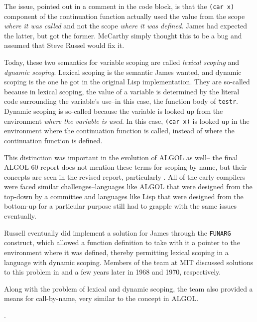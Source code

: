 The issue, pointed out in a comment in the code block, is that the \texttt{(car x)}
component of the continuation function actually used the value from the scope
\textit{where it was called} and not the scope \textit{where it was defined}.
James had expected the latter, but got the former.
McCarthy simply thought this to be a bug and assumed that Steve Russel would fix it.

Today, these two semantics for variable scoping are called \textit{lexical scoping}
and \textit{dynamic scoping}.
Lexical scoping is the semantic James wanted, and dynamic scoping is the one he got
in the original Lisp implementation.
They are so-called because in lexical scoping, the value of a variable is determined
by the literal code surrounding the variable's use--in this case, the function body
of \texttt{testr}.
Dynamic scoping is so-called because the variable is looked up from the environment
\textit{where the variable is used}. In this case, \texttt{(car x)} is looked up in the
environment where the continuation function is called, instead of where the continuation
function is defined.

This distinction was important in the evolution of ALGOL as well--
the final ALGOL 60 report does not mention these terms for scoping by name,
but their concepts are seen in the revised report, particularly
\cite[Section 4.7.3.3. Body replacement and execution]{revised_report_on_the_algorithmic_language_algol_68_1976}.
All of the early compilers were faced similar challenges--languages like ALGOL
that were designed from the top-down by a committee and languages like Lisp
that were designed from the bottom-up for a particular purpose still had to
grapple with the same issues eventually.

Russell eventually did implement a solution for James through the \texttt{FUNARG}
construct, which allowed a function definition to take with it a pointer to the
environment where it was defined, thereby permitting lexical scoping in a language
with dynamic scoping.
Members of the team at MIT discussed solutions to this problem in
and
a few years later in 1968 and 1970, respectively.

Along with the problem of lexical and dynamic scoping, the team also provided a means for
\gls{call-by-name}, very similar to the concept in ALGOL.

.

